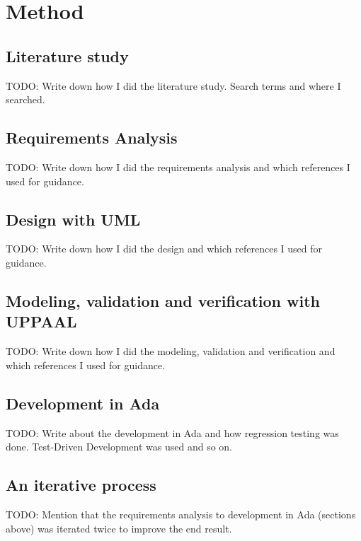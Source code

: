 \chapter{Method}
\section{Literature study}
TODO: Write down how I did the literature study. Search terms and where I
searched.

\section{Requirements Analysis}
TODO: Write down how I did the requirements analysis and which references I
used for guidance.

\section{Design with UML}
TODO: Write down how I did the design and which references I used for guidance.

\section{Modeling, validation and verification with UPPAAL}
TODO: Write down how I did the modeling, validation and verification and which
references I used for guidance.

\section{Development in Ada}
TODO: Write about the development in Ada and how regression testing was done.
Test-Driven Development was used and so on.

\section{An iterative process}
TODO: Mention that the requirements analysis to development in Ada (sections
above) was iterated twice to improve the end result.
